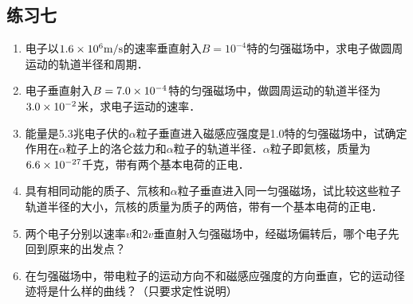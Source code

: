 \subsection{练习七}
\begin{enumerate}
    \item 电子以$1.6\times10^6\text{m}/\text{s}$的速率垂直射入$B=10^{-4}$特的匀强磁场中，求电子做圆周运动的轨道半径和周期．


    \begin{solution}
    
    \end{solution}
    
    \item 电子垂直射入$B=7.0\times10^{-4}$特的匀强磁场中，做圆周运动的轨道半径为$3.0\times10^{-2}$米，求电子运动的速率．


    \begin{solution}
    
    \end{solution}
    
    \item 能量是5.3兆电子伏的$\alpha$粒子垂直进入磁感应强度是1.0特的匀强磁场中，试确定作用在$\alpha$粒子上的洛仑兹力和$\alpha$粒子的轨道半径．$\alpha$粒子即氦核，质量为$6.6\times10^{-27}$千克，带有两个基本电荷的正电．


    \begin{solution}
    
    \end{solution}
    
    \item 具有相同动能的质子、氘核和$\alpha$粒子垂直进入同一匀强磁场，试比较这些粒子轨道半径的大小，氘核的质量为质子的两倍，带有一个基本电荷的正电．


    \begin{solution}
    
    \end{solution}
    
    \item 两个电子分别以速率$v$和$2v$垂直射入匀强磁场中，经磁场偏转后，哪个电子先回到原来的出发点？


    \begin{solution}
    
    \end{solution}
    
    \item 在匀强磁场中，带电粒子的运动方向不和磁感应强度的方向垂直，它的运动径迹将是什么样的曲线？（只要求定性说明）


    \begin{solution}
    
    \end{solution}
    
\end{enumerate}







